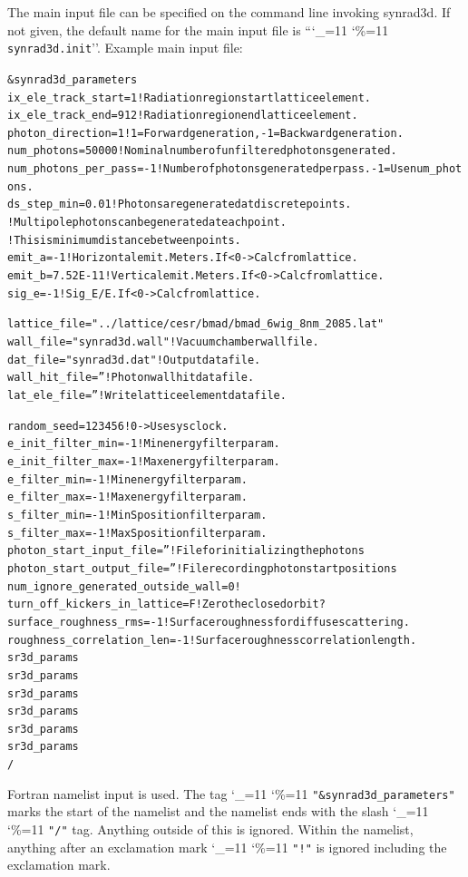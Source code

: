 \documentclass[11pt]{article}
\newcommand\ttcmd{\begingroup\catcode`\_=11 \catcode`\%=11 \dottcmd}
\newcommand\dottcmd[1]{\texttt{#1}\endgroup}
\newcommand{\vn}{\ttcmd}
\newlength{\ExBeg}
\newlength{\ExEnd}
\newenvironment{example}
  {\vspace{\ExBeg} \begin{alltt}}
  {\end{alltt} \vspace{\ExEnd}}
\begin{document}
The main input file can be specified on the command line invoking synrad3d.
If not given, the default name for the main input file is ``\vn{synrad3d.init}''.
Example main input file:
\begin{example}
  &synrad3d_parameters
    ix_ele_track_start   = 1      ! Radiation region start lattice element.
    ix_ele_track_end     = 912    ! Radiation region end lattice element.
    photon_direction     = 1      ! 1 = Forward generation, -1 = Backward generation.
    num_photons          = 50000  ! Nominal number of unfiltered photons generated. 
    num_photons_per_pass = -1     ! Number of photons generated per pass. -1 = Use num_photons.
    ds_step_min      = 0.01   ! Photons are generated at discrete points. 
                              ! Multipole photons can be generated at each point.
                              ! This is minimum distance between points.
    emit_a       = -1         ! Horizontal emit. Meters. If < 0 -> Calc from lattice.
    emit_b       = 7.52E-11   ! Vertical emit.  Meters. If < 0 -> Calc from lattice.
    sig_e        = -1         ! Sig_E/E. If < 0 -> Calc from lattice.

    lattice_file = "../lattice/cesr/bmad/bmad_6wig_8nm_2085.lat" 
    wall_file    = "synrad3d.wall"   ! Vacuum chamber wall file.
    dat_file     = "synrad3d.dat"    ! Output data file.
    wall_hit_file = ''               ! Photon wall hit data file.
    lat_ele_file  = ''               ! Write lattice element data file.

    random_seed = 123456             ! 0 -> Use sys clock.
    e_init_filter_min = -1           ! Min energy filter param.
    e_init_filter_max = -1           ! Max energy filter param.
    e_filter_min = -1                ! Min energy filter param.
    e_filter_max = -1                ! Max energy filter param.
    s_filter_min = -1                ! Min S position filter param.
    s_filter_max = -1                ! Max S position filter param.
    photon_start_input_file  = ''    ! File for initializing the photons
    photon_start_output_file = ''    ! File recording photon start positions
    num_ignore_generated_outside_wall = 0    !
    turn_off_kickers_in_lattice = F          ! Zero the closed orbit?
    surface_roughness_rms = -1               ! Surface roughness for diffuse scattering.
    roughness_correlation_len = -1           ! Surface roughness correlation length.
    sr3d_params%
    sr3d_params%
    sr3d_params%
    sr3d_params%
    sr3d_params%
    sr3d_params%
  /
\end{example}
Fortran namelist input is used.  The tag \vn{"\&synrad3d_parameters"}
marks the start of the namelist and the namelist ends with the slash
\vn{"/"} tag. Anything outside of this is ignored. Within the
namelist, anything after an exclamation mark \vn{"!"} is ignored
including the exclamation mark.
\end{document}
